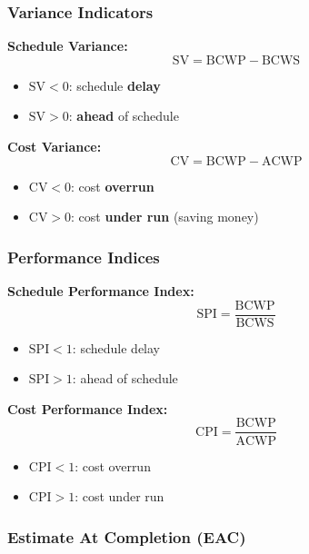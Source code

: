 \documentclass[11pt,a4paper]{article}
\theoremstyle{definition}
\theoremstyle{plain}
\begin{document}
\subsubsection{Variance Indicators}

\begin{formulabox}
\textbf{Schedule Variance:}
\[
  \mathrm{SV} = \mathrm{BCWP} - \mathrm{BCWS}
\]
\begin{itemize}[nosep]
  \item $\mathrm{SV} < 0$: schedule \textbf{delay}
  \item $\mathrm{SV} > 0$: \textbf{ahead} of schedule
\end{itemize}

\textbf{Cost Variance:}
\[
  \mathrm{CV} = \mathrm{BCWP} - \mathrm{ACWP}
\]
\begin{itemize}[nosep]
  \item $\mathrm{CV} < 0$: cost \textbf{overrun}
  \item $\mathrm{CV} > 0$: cost \textbf{under run} (saving money)
\end{itemize}
\end{formulabox}

\subsubsection{Performance Indices}

\begin{formulabox}
\textbf{Schedule Performance Index:}
\[
  \mathrm{SPI} = \frac{\mathrm{BCWP}}{\mathrm{BCWS}}
\]
\begin{itemize}[nosep]
  \item $\mathrm{SPI} < 1$: schedule delay
  \item $\mathrm{SPI} > 1$: ahead of schedule
\end{itemize}

\textbf{Cost Performance Index:}
\[
  \mathrm{CPI} = \frac{\mathrm{BCWP}}{\mathrm{ACWP}}
\]
\begin{itemize}[nosep]
  \item $\mathrm{CPI} < 1$: cost overrun
  \item $\mathrm{CPI} > 1$: cost under run
\end{itemize}
\end{formulabox}

\subsubsection{Estimate At Completion (EAC)}
\end{document}
